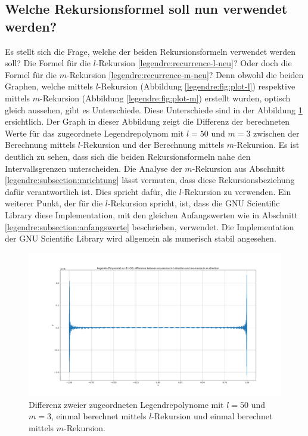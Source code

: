 \subsection{Welche Rekursionsformel soll nun verwendet werden?
\label{legendre:subsection:welche}}
Es stellt sich die Frage, welche der beiden Rekursionsformeln verwendet werden soll?
Die Formel für die $l$-Rekursion \eqref{legendre:recurrence-l-neu}?
Oder doch die Formel für die $m$-Rekursion \eqref{legendre:recurrence-m-neu}?
Denn obwohl die beiden Graphen, welche mittels $l$-Rekursion (Abbildung \ref{legendre:fig:plot-l}) respektive mittels $m$-Rekursion (Abbildung \ref{legendre:fig:plot-m}) erstellt wurden, optisch gleich aussehen, gibt es Unterschiede.
Diese Unterschiede sind in der Abbildung \ref{legendre:fig:plot-diff} ersichtlich.
Der Graph in dieser Abbildung zeigt die Differenz der berechneten Werte für das zugeordnete Legendrepolynom mit $l=50$ und $m=3$ zwischen der Berechnung mittels $l$-Rekursion und der Berechnung mittels $m$-Rekursion.
Es ist deutlich zu sehen, dass sich die beiden Rekursionsformeln nahe den Intervallsgrenzen unterscheiden.
Die Analyse der $m$-Rekursion aus Abschnitt \ref{legendre:subsection:mrichtung} lässt vermuten, dass diese Rekursionsbeziehung dafür verantwortlich ist.
Dies spricht dafür, die $l$-Rekursion zu verwenden.
Ein weiterer Punkt, der für die $l$-Rekursion spricht, ist, dass die GNU Scientific Library \cite{legendre:gsl} diese Implementation, mit den gleichen Anfangswerten wie in Abschnitt \ref{legendre:subsection:anfangswerte} beschrieben, verwendet.
Die Implementation der GNU Scientific Library wird allgemein als numerisch stabil angesehen.
\begin{figure}[!ht]
\centering
\includegraphics[width=1.0\linewidth]{papers/legendre/plots/plot_diff_l_m}
\caption{Differenz zweier zugeordneten Legendrepolynome mit \texorpdfstring{$l=50$}{l=50} und \texorpdfstring{$m=3$}{m=3}, einmal berechnet mittels \texorpdfstring{$l$}{l}-Rekursion und einmal berechnet mittels \texorpdfstring{$m$}{m}-Rekursion.}
\label{legendre:fig:plot-diff}
\end{figure}
